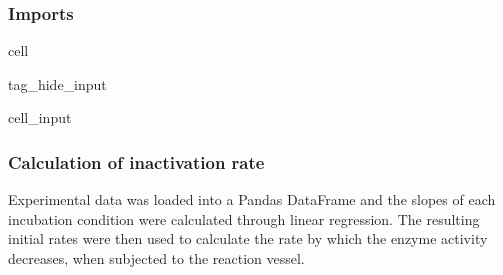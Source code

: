 \documentclass[letterpaper,12pt,english]{jupyterBook}
\begin{document}
\subsubsection{Imports}
\label{\detokenize{scenarios/enzyme_inactivation:imports}}
\begin{sphinxuseclass}{cell}
\begin{sphinxuseclass}{tag_hide_input}\begin{sphinxVerbatimInput}

\begin{sphinxuseclass}{cell_input}
\begin{sphinxVerbatim}[commandchars=\\\{\}]
   
   
   
   
   
   
   
   
 
   

 
\end{sphinxVerbatim}

\end{sphinxuseclass}\end{sphinxVerbatimInput}

\end{sphinxuseclass}
\end{sphinxuseclass}

\subsubsection{Calculation of inactivation rate}
\label{\detokenize{scenarios/enzyme_inactivation:calculation-of-inactivation-rate}}
\sphinxAtStartPar
Experimental data was loaded into a Pandas DataFrame and the slopes of each incubation condition were calculated through linear regression. The resulting initial rates were then used to calculate the rate by which the enzyme activity decreases, when subjected to the reaction vessel.
\end{document}
